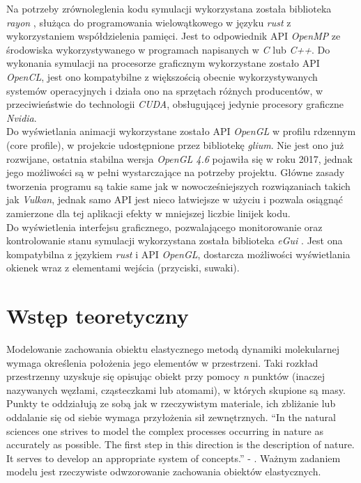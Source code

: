 \documentclass[12pt, letterpaper]{report}
\begin{document}
    Na potrzeby zrównoleglenia kodu symulacji wykorzystana została biblioteka \emph{rayon} \cite{rayon}, służąca
    do programowania wielowątkowego w języku \emph{rust} z wykorzystaniem współdzielenia pamięci. 
    Jest to odpowiednik API \emph{OpenMP} ze środowiska wykorzystywanego w 
    programach napisanych w \emph{C} lub \emph{C++}. 
    Do wykonania symulacji na procesorze graficznym wykorzystane zostało API \emph{OpenCL}, jest ono kompatybilne
    z większością obecnie wykorzystywanych systemów operacyjnych i działa ono na sprzętach różnych producentów, 
    w przeciwieństwie do technologii \emph{CUDA}, obsługującej jedynie procesory graficzne \emph{Nvidia}. \\
    
    Do wyświetlania animacji wykorzystane zostało API \emph{\emph{OpenGL}} w profilu rdzennym (core profile), w projekcie
    udostępnione przez bibliotekę \emph{glium}. Nie jest ono już rozwijane, ostatnia stabilna wersja 
    \emph{\emph{OpenGL} 4.6} pojawiła się w roku 2017, jednak jego możliwości są w pełni wystarczające
    na potrzeby projektu. Główne zasady tworzenia programu są takie same jak w nowocześniejszych rozwiązaniach 
    takich jak \emph{Vulkan}, jednak samo API jest nieco łatwiejsze w użyciu i pozwala osiągnąć zamierzone 
    dla tej aplikacji efekty w mniejszej liczbie linijek kodu. \\

    Do wyświetlenia interfejsu graficznego, pozwalającego monitorowanie oraz kontrolowanie stanu symulacji  
    wykorzystana została biblioteka \emph{eGui} \cite{egui}. Jest ona kompatybilna z językiem \emph{rust} 
    i API \emph{\emph{OpenGL}}, dostarcza możliwości wyświetlania okienek wraz z elementami wejścia (przyciski, suwaki). \\

    
\chapter{Wstęp teoretyczny}

    Modelowanie zachowania obiektu elastycznego metodą dynamiki molekularnej wymaga określenia 
    położenia jego elementów w przestrzeni. Taki rozkład przestrzenny uzyskuje się opisując 
    obiekt przy pomocy \emph{n} punktów (inaczej nazywanych węzłami, cząsteczkami lub atomami), w 
    których skupione są masy. Punkty te oddziałują ze sobą jak w rzeczywistym materiale, ich 
    zbliżanie lub oddalanie się od siebie wymaga przyłożenia sił zewnętrznych.
    ``In the natural sciences one strives to model the complex 
        processes occurring in nature as accurately as possible. 
        The first step in this direction is the description of nature. 
        It serves to develop an appropriate system of concepts.'' - \cite{moleculardynamics}. 
    Ważnym zadaniem modelu jest rzeczywiste odwzorowanie zachowania obiektów elastycznych.
\end{document}
